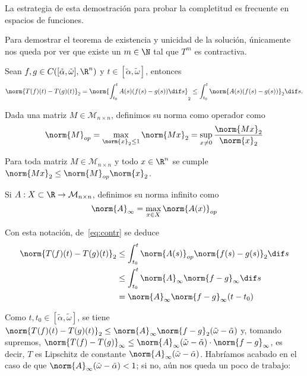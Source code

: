 \documentclass[../main.tex]{subfiles}
\begin{document}
\begin{remark}
  La estrategia de esta demostración para probar la completitud es frecuente en
  espacios de funciones.
\end{remark}

Para demostrar el teorema de existencia y unicidad de la solución, únicamente
nos queda por ver que existe un \(m \in \N\) tal que \(T^m\) es contractiva.

Sean \(f, g \in C([\tilde{\alpha}, \tilde{\omega}], \R^n)\) y \(t \in
[\tilde{\alpha}, \tilde{\omega}]\), entonces
\begin{equation}
  \label{eq:contr}
  \norm{T(f)(t) - T(g)(t)}_2 = \norm{\int_{t_0}^tA(s)(f(s)-g(s))\dif s}_2 \leq
  \int_{t_0}^t \norm{A(s)(f(s)-g(s))}_2\dif s.
\end{equation}

\begin{definition}
  Dada una matriz \(M \in \mathcal{M}_{n \times n}\), definimos su norma como operador como
  \[\norm{M}_{op} = \max_{\norm{x}_2 \leq 1} \norm{Mx}_2 = \sup_{x \neq 0}
    \frac{\norm{Mx}_2}{\norm{x}_2}\]
\end{definition}

\begin{remark}
  Para toda matriz \(M \in \mathcal{M}_{n \times n}\) y todo \(x \in \R^n\) se cumple
  \(\norm{Mx}_2 \leq \norm{M}_{op} \norm{x}_2\).
\end{remark}

\begin{definition}
  Si \(A : X \subset \R \to \mathcal{M}_{n \times n}\), definimos su norma infinito como
  \[\norm{A}_\infty = \max_{x \in X} \norm{A(x)}_{op}\]
\end{definition}

Con esta notación, de~\eqref{eq:contr} se deduce
\begin{align*}
  \norm{T(f)(t) - T(g)(t)}_2 &\leq \int_{t_0}^t
  \norm{A(s)}_{op}\norm{f(s)-g(s)}_2\dif s \\
  &\leq \int_{t_0}^t \norm{A}_\infty
    \norm{f-g}_\infty\dif s\\
  &= \norm{A}_\infty\norm{f-g}_\infty(t-t_0)
\end{align*}

Como \(t, t_0 \in [\tilde{\alpha}, \tilde{\omega}]\), se tiene
\(\norm{T(f)(t)-T(g)(t)}_2 \leq
\norm{A}_\infty\norm{f-g}_2(\tilde{\omega}-\tilde{\alpha})\) y, tomando
supremos, \(\norm{T(f)-T(g)}_\infty \leq \norm{A}_\infty(\tilde{\omega} -
\tilde{\alpha}) \cdot \norm{f-g}_\infty\), es decir, \(T\) es Lipschitz de
constante \(\norm{A}_\infty(\tilde{\omega}-\tilde{\alpha})\). Habríamos
acabado en el caso de que \(\norm{A}_\infty(\tilde{\omega}-\tilde{\alpha}) <
1\); si no, aún nos queda un poco de trabajo:
\end{document}
